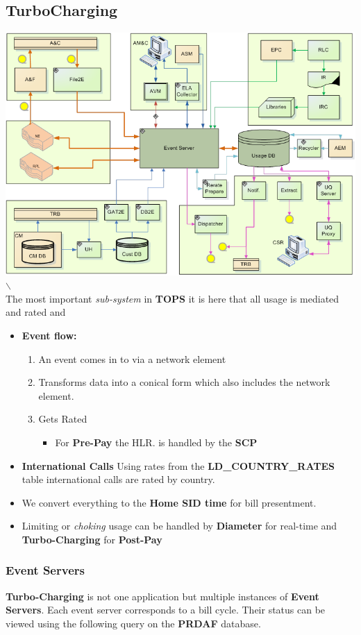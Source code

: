 \documentclass[12pt,twoside]{article}
\begin{document}
\subsection{TurboCharging}
\label{sec:orgheadline5}
\includegraphics[width=.9\linewidth]{Pictures/TC.png} $\backslash$\ \\
The most important \emph{sub-system} in \textbf{TOPS} it is here that all usage is mediated and rated and 
\begin{itemize}
\item \textbf{Event flow:}

\begin{enumerate}
\item An event comes in to via a network element
\item Transforms data into a conical form which also includes the
network element.
\item Gets Rated
\begin{itemize}
\item For \textbf{Pre-Pay} the HLR. is handled by the
\textbf{SCP}
\end{itemize}
\end{enumerate}

\item \textbf{International Calls} Using rates from the \textbf{LD\_COUNTRY\_RATES} table international calls are rated by country.
\item We convert everything to the \textbf{Home SID time} for bill
presentment.
\item Limiting or \emph{choking} usage can be handled by \textbf{Diameter} for
real-time and \textbf{Turbo-Charging} for \textbf{Post-Pay}
\end{itemize}
\subsubsection{Event Servers}
\label{sec:orgheadline3}
\textbf{Turbo-Charging} is not one application but multiple instances of \textbf{Event Servers}. Each event server corresponds to a bill cycle. Their status can be viewed using
     the following query on the \textbf{PRDAF} database.
\end{document}

